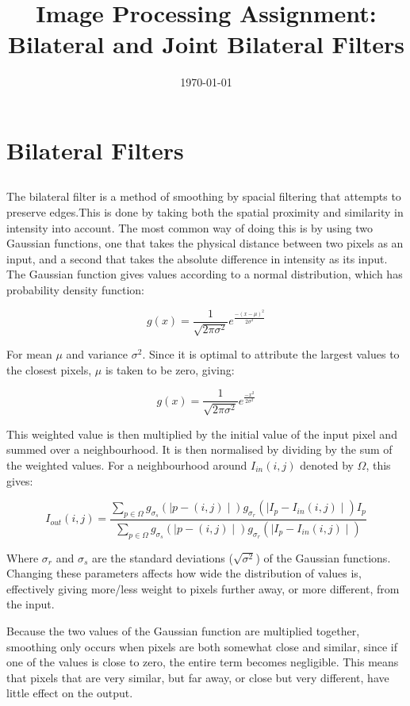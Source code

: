 \documentclass{article}
\begin{document}
	\title{Image Processing Assignment: Bilateral and Joint Bilateral Filters}
	\date{\printdayoff\today}
	\maketitle
	\newpage
	\section{Bilateral Filters}
	\subsection{}
	The bilateral filter is a method of smoothing by spacial filtering that attempts to preserve edges.This is done by taking both the spatial proximity and similarity in intensity into account. The most common way of doing this is by using two Gaussian functions, one that takes the physical distance between two pixels as an input, and a second that takes the absolute difference in intensity as its input. The Gaussian function gives values according to a normal distribution, which has probability density function:
	
	$$g(x) = \frac{1}{\sqrt{2\pi\sigma^2}}e^\frac{-(x-\mu)^2}{2\sigma^2}$$

	\noindent For mean $\mu$ and variance $\sigma^2$. Since it is optimal to attribute the largest values to the closest pixels, $\mu$ is taken to be zero, giving:
	
	$$g(x) = \frac{1}{\sqrt{2\pi\sigma^2}}e^\frac{-x^2}{2\sigma^2}$$
	
	\noindent This weighted value is then multiplied by the initial value of the input pixel and summed over a neighbourhood. It is then normalised by dividing by the sum of the weighted values. For a neighbourhood around $I_{in}(i,j)$ denoted by $\Omega$, this gives:
	
	$$I_{out}(i,j) = \frac{\sum_{p\in\Omega}g_{\sigma_s}(\mid p-(i,j)\mid)g_{\sigma_r}(\mid I_{p}-I_{in}(i,j)\mid)I_{p}}{\sum_{p\in\Omega}g_{\sigma_s}(\mid p-(i,j)\mid)g_{\sigma_r}(\mid I_{p}-I_{in}(i,j)\mid)}$$
	
	\noindent Where $\sigma_r$ and $\sigma_s$ are the standard deviations ($\sqrt{\sigma^2}$) of the Gaussian functions. Changing these parameters affects how wide the distribution of values is, effectively giving more/less weight to pixels further away, or more different, from the input.
	
	Because the two values of the Gaussian function are multiplied together, smoothing only occurs when pixels are both somewhat close and similar, since if one of the values is close to zero, the entire term becomes negligible. This means that pixels that are very similar, but far away, or close but very different, have little effect on the output.
	
\end{document}
